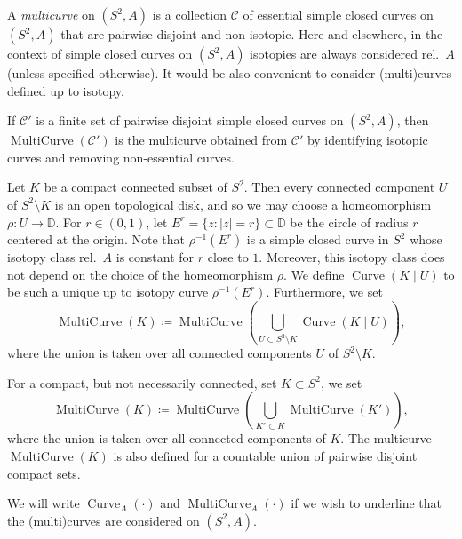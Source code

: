 \documentclass{amsart}
\theoremstyle{plain}
\theoremstyle{definition}
\theoremstyle{remark}
\newcommand{\disk}{{\mathbb D}}
\newcommand{\CC}{{\mathcal C}}
\newcommand{\MC}{{\operatorname{MultiCurve}}}
\newcommand{\Curve}{{\operatorname{Curve}}}
\begin{document}

A \emph{multicurve} on $(S^2,A)$ is a collection $\CC$ of essential simple closed curves on $(S^2,A)$ that are pairwise disjoint and non-isotopic. Here and elsewhere, in the context of simple closed curves on $(S^2,A)$ isotopies are always considered rel.\ $A$ (unless specified otherwise). It would be also convenient to consider (multi)curves defined up to isotopy.%

If $\CC'$ is a finite set of pairwise disjoint simple closed curves on $(S^2,A)$, then $\MC(\CC')$ is the multicurve obtained from $\CC'$ by identifying isotopic curves and removing non-essential curves.

Let $K$ be a compact connected subset of $S^2$. Then every connected component $U$ of $S^2\setminus K$ is an open topological disk, and so we may choose a homeomorphism $\rho\colon U\to \disk$. For $r\in (0,1)$, let $E^r=\{z\colon |z|=r\}\subset \disk$ be the circle of radius $r$ centered at the origin.  Note that $\rho^{-1}(E^r)$ is a simple closed curve in $S^2$ whose isotopy class rel.\ $A$ is constant for $r$ close to $1$. Moreover, this isotopy class does not depend on the choice of the homeomorphism $\rho$. 
We define $\Curve(K\mid U)$ to be such a unique up to isotopy curve $\rho^{-1}(E^r)$. 
Furthermore, we set 
\[ \MC(K)\coloneq \MC \left( \bigcup_{U\subset S^2\setminus K} \Curve(K\mid U) \right),\]
where the union is taken over all connected components $U$ of $S^2\setminus K$. 

For a compact, but not necessarily connected, set $K\subset S^2$, we set 
\[\MC(K) \coloneq \MC\left(\bigcup_{K'\subset K}  \MC(K')\right),\]
where the union is taken over all connected components of $K$. The multicurve $\MC(K)$ is also defined for a countable union of pairwise disjoint compact sets. 


We will write $\Curve_A(\cdot)$ and $\MC_A(\cdot)$ if we wish to underline that the (multi)curves are considered on $(S^2,A)$. 
\end{document}
